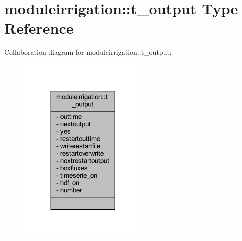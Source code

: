 \hypertarget{structmoduleirrigation_1_1t__output}{}\section{moduleirrigation\+:\+:t\+\_\+output Type Reference}
\label{structmoduleirrigation_1_1t__output}


Collaboration diagram for moduleirrigation\+:\+:t\+\_\+output\+:\nopagebreak
\begin{figure}[H]
\begin{center}
\leavevmode
\includegraphics[width=176pt]{structmoduleirrigation_1_1t__output__coll__graph}
\end{center}
\end{figure}

